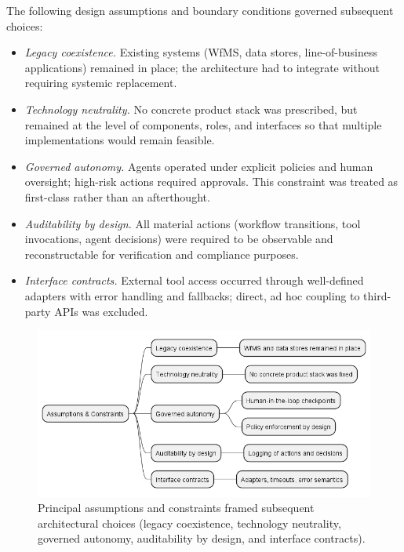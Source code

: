 The following design assumptions and boundary conditions governed subsequent choices:
\begin{itemize}
\item \emph{Legacy coexistence.} Existing systems (WfMS, data stores, line-of-business applications) remained in place; the architecture had to integrate without requiring systemic replacement.
\item \emph{Technology neutrality.} No concrete product stack was prescribed, but remained at the level of components, roles, and interfaces so that multiple implementations would remain feasible.
\item \emph{Governed autonomy.} Agents operated under explicit policies and human oversight; high-risk actions required approvals. This constraint was treated as first-class rather than an afterthought.
\item \emph{Auditability by design.} All material actions (workflow transitions, tool invocations, agent decisions) were required to be observable and reconstructable for verification and compliance purposes.
\item \emph{Interface contracts.} External tool access occurred through well-defined adapters with error handling and fallbacks; direct, ad hoc coupling to third-party APIs was excluded.
\end{itemize}

\begin{figure}[H]
  \centering
  \includegraphics[width=0.8\linewidth]{ressources/MAS/figures/5_1d_assumptions_mindmap.png}
  \caption{Principal assumptions and constraints framed subsequent architectural choices (legacy coexistence, technology neutrality, governed autonomy, auditability by design, and interface contracts).}
  \label{fig:5.1d-assumptions}
\end{figure}

